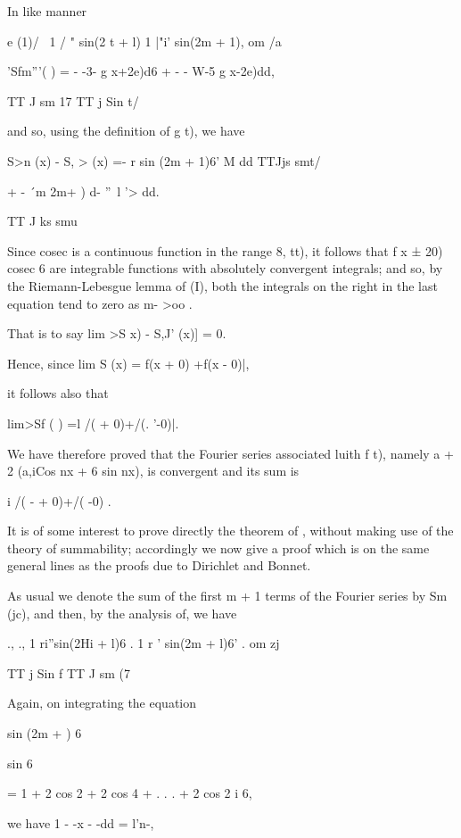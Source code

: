 In like manner

e (1)/ \ 1 / " sin(2 t + l) 1 |"i' sin(2m + 1), om /a

'Sfm'''( ) = - -3- g x+2e)d6 + - - W-5 g x-2e)dd,

TT J sm 17 TT j Sin t/

and so, using the definition of g t), we have

S>n (x) - S, > (x) =- r sin (2m + 1)6' M dd TTJjs smt/

+ - \'\ m 2m+ ) d- ''~l '> dd.

TT J ks smu

Since cosec is a continuous function in the range 8, tt), it follows
that f x ± 20) cosec 6 are integrable functions with absolutely
convergent integrals; and so, by the Riemann-Lebesgue lemma of
(I), both the integrals on the right in the last equation tend to zero
as m- >oo .

That is to say lim >S x) - S,J' (x)] = 0.

Hence, since lim S (x) = f(x + 0) +f(x - 0)|,

it follows also that

lim>Sf ( ) =l /( + 0)+/(. '-0)|.

We have therefore proved that the Fourier series associated luith f
t), namely a + 2 (a,iCos nx + 6 sin nx), is convergent and its sum is

i /( - + 0)+/( -0) .

It is of some interest to prove directly the theorem of ,
without making use of the theory of summability; accordingly we now
give a proof which is on the same general lines as the proofs due to
Dirichlet and Bonnet.

%
%

As usual we denote the sum of the first m + 1 terms of the Fourier
series by Sm (jc), and then, by the analysis of, we have

., ., 1 ri''sin(2Hi + l)6 . 1 r ' sin(2m + l)6' . om zj

TT j Sin f TT J sm (7

Again, on integrating the equation

sin (2m + ) 6

sin 6

= 1 + 2 cos 2 + 2 cos 4 + . . . + 2 cos 2 i 6,

we have 1 - -x - -dd = l'n-,

